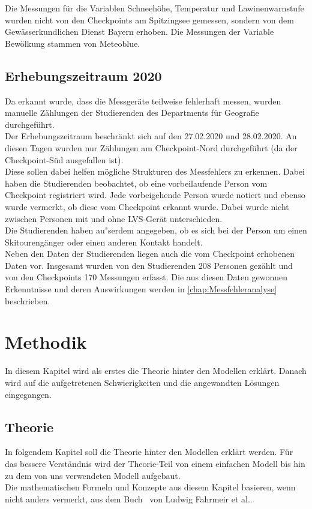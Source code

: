 \documentclass[12pt]{scrreprt}
\begin{document}
\noindent Die Messungen für die Variablen Schneehöhe, Temperatur und Lawinenwarnstufe wurden nicht von den Checkpoints am Spitzingsee gemessen, sondern von dem Gewässerkundlichen Dienst Bayern erhoben. Die Messungen der Variable Bewölkung stammen von Meteoblue. %

\section{Erhebungszeitraum 2020}
Da erkannt wurde, dass die Messgeräte teilweise fehlerhaft messen, wurden manuelle Zählungen der Studierenden des Departments für Geografie durchgeführt. \\
Der Erhebungszeitraum beschränkt sich auf den 27.02.2020 und 28.02.2020. An diesen Tagen wurden nur Zählungen am Checkpoint-Nord durchgeführt (da der Checkpoint-Süd ausgefallen ist). \\
Diese sollen dabei helfen mögliche Strukturen des Messfehlers zu erkennen. Dabei haben die Studierenden beobachtet, ob eine vorbeilaufende Person vom Checkpoint registriert wird. Jede vorbeigehende Person wurde notiert und ebenso wurde vermerkt, ob diese vom Checkpoint erkannt wurde. Dabei wurde nicht zwischen Personen mit und ohne LVS-Gerät unterschieden.\\ Die Studierenden haben au"serdem angegeben, ob es sich bei der Person um einen Skitourengänger oder einen anderen Kontakt handelt. \\
Neben den Daten der Studierenden liegen auch die vom Checkpoint erhobenen Daten vor. Insgesamt wurden von den Studierenden 208 Personen gezählt und von den Checkpoints 170 Messungen erfasst. Die aus diesen Daten gewonnen Erkenntnisse und deren Auswirkungen werden in \autoref{chap:Messfehleranalyse} beschrieben. 

\chapter{Methodik}
\vspace{-0.5cm}
In diesem Kapitel wird als erstes die Theorie hinter den Modellen erklärt. Danach wird auf die aufgetretenen Schwierigkeiten und die angewandten Lösungen eingegangen.

\section{Theorie}
In folgendem Kapitel soll die Theorie hinter den Modellen erklärt werden. Für das bessere Verständnis wird der Theorie-Teil von einem einfachen Modell bis hin zu dem von uns verwendeten Modell aufgebaut. \\
Die mathematischen Formeln und Konzepte aus diesem Kapitel basieren, wenn nicht anders vermerkt, aus dem Buch \grqq ~von Ludwig Fahrmeir et al..
\end{document}
